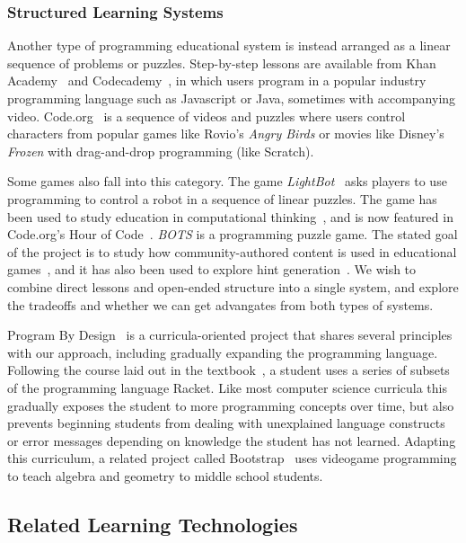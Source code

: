 \documentclass{sig-alternate}
\begin{document}
\subsubsection{Structured Learning Systems}
Another type of programming educational system is instead arranged as a linear sequence of problems or puzzles.
Step-by-step lessons are available from Khan Academy~\cite{khanacademy} and Codecademy~\cite{codecademy}, in which users program in a popular industry programming language such as Javascript or Java, sometimes with accompanying video.
Code.org~\cite{codedotorg} is a sequence of videos and puzzles where users control characters from popular games like Rovio's \emph{Angry Birds} or movies like Disney's \emph{Frozen} with drag-and-drop programming (like Scratch).

Some games also fall into this category.
The game \emph{LightBot}~\cite{lightbot} asks players to use programming to control a robot in a sequence of linear puzzles.
The game has been used to study education in computational thinking~\cite{Gouws13Lightbot}, and is now featured in Code.org's Hour of Code~\cite{lightbothoc}.
\emph{BOTS} is a programming puzzle game. The stated goal of the project is to study how community-authored content is used in educational games~\cite{hickspart14}, and it has also been used to explore hint generation~\cite{peddycord14generating}.
We wish to combine direct lessons and open-ended structure into a single system, and explore the tradeoffs and whether we can get advangates from both types of systems.

Program By Design~\cite{programbydesign} is a curricula-oriented project that shares several principles with our approach, including gradually expanding the programming language. 
Following the course laid out in the textbook~\cite{felleisen2001design}, a student uses a series of subsets of the programming language Racket.
Like most computer science curricula this gradually exposes the student to more programming concepts over time, but also prevents beginning students from dealing with unexplained language constructs or error messages depending on knowledge the student has not learned.
Adapting this curriculum, a related project called Bootstrap~\cite{bootstrap} uses videogame programming to teach algebra and geometry to middle school students.

\subsection{Related Learning Technologies}
\end{document}
